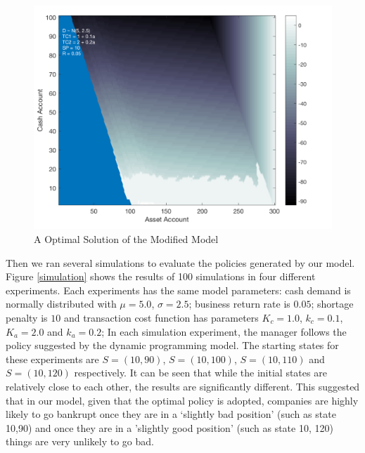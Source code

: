 \documentclass[12pt]{article}
\begin{document}
\begin{figure}
\begin{center}
\includegraphics[scale=.3]{ModifiedModel}
\end{center}
\caption{A Optimal Solution of the Modified Model}
\label{ModifiedModel}
\end{figure}

Then we ran several simulations to evaluate the policies generated by our model. Figure \ref{simulation} shows the results of 100 simulations in four different experiments. Each experiments has the same model parameters: cash demand is normally distributed with $\mu=5.0$, $\sigma=2.5$; business return rate is $0.05$; shortage penalty is $10$ and transaction cost function has parameters $K_c = 1.0$, $k_c=0.1$,$K_a=2.0$ and $k_a=0.2$; In each simulation experiment, the manager follows the policy suggested by the dynamic programming model. The starting states for these experiments are $S = (10,90)$, $S=(10,100)$, $S=(10,110)$ and $S=(10,120)$ respectively. It can be seen that while the initial states are relatively close to each other, the results are significantly different. This suggested that in our model, given that the optimal policy is adopted, companies are highly likely to go bankrupt once they are in a `slightly bad position' (such as state 10,90) and once they are in a 'slightly good position' (such as state 10, 120) things are very unlikely to go bad.
\end{document}
